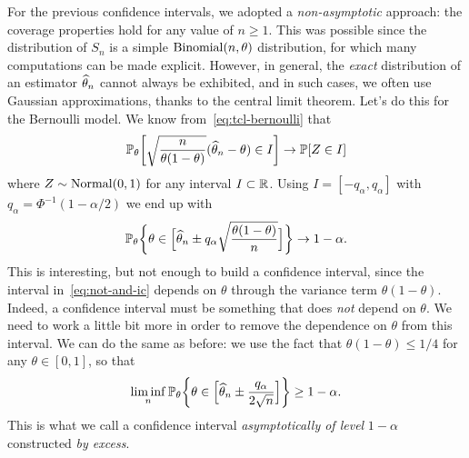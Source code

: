 
For the previous confidence intervals, we adopted a \emph{non-asymptotic} approach: the coverage properties hold for any value of $n \geq 1$.
This was possible since the distribution of $S_n$ is a simple $\operatorname{Binomial}(n, \theta)$ distribution, for which many computations can be made explicit.
However, in general, the \emph{exact} distribution of an estimator $\widehat \theta_n$ cannot always be  exhibited, and in such cases, we often use Gaussian approximations, thanks to the central limit theorem. 
Let's do this for the Bernoulli model.
We know from~\eqref{eq:tcl-bernoulli} that
\begin{equation}
	\label{eq:portemanteau-bernoulli}
	\mathbb P_\theta \bigg[ \sqrt{\frac{n}{\theta (1 - \theta)}} (\widehat \theta_n - \theta) \in I
	\bigg] \rightarrow \mathbb P[Z \in I]
\end{equation}
where $Z \sim \operatorname{Normal}(0, 1)$ for any interval $I \subset \mathbb R$.%
%
Using $I = [-q_\alpha, q_\alpha]$ with $q_\alpha = \Phi^{-1}(1 - \alpha / 2)$ we end up%
%
with
\begin{equation}
	\label{eq:not-and-ic}
	\mathbb P_\theta\bigg\{ \theta \in \Big[ \widehat \theta_n \pm q_\alpha \sqrt{\frac{\theta(1 - \theta)}{n}} \Big] \bigg\} \rightarrow 1 - \alpha.
\end{equation}
This is interesting, but not enough to build a confidence interval, since the interval in~\eqref{eq:not-and-ic} depends on $\theta$ through the variance term $\theta(1 - \theta)$.
Indeed, a confidence interval must be something that does \emph{not} depend on $\theta$.
We need to work a little bit more in order to remove the dependence on $\theta$ from this interval. 
We can do the same as before: we use the fact that $\theta (1 - \theta) \leq 1 / 4$ for any $\theta \in [0, 1]$, so that
\begin{equation}
	\label{eq:binomial-ci-excess}
	\liminf_n \mathbb P_\theta \bigg\{ \theta \in \Big [\widehat \theta_n \pm \frac{q_\alpha}{2 \sqrt n} \Big] \bigg\} \geq 1 - \alpha.
\end{equation}
This is what we call a confidence interval \emph{asymptotically of level} $1 - \alpha$ constructed \emph{by excess}.

